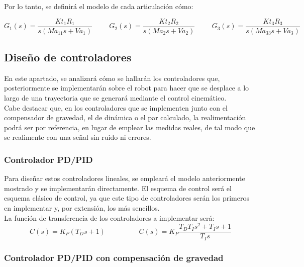 Por lo tanto, se definirá el modelo de cada articulación cómo:

\begin{equation}
G_{1}(s)=\frac{Kt_{1}R_{1}}{s(Ma_{11}s+Va_{1})} \hspace{1cm} G_{2}(s)=\frac{Kt_{2}R_{2}}{s(Ma_{2}s+Va_{2})} \hspace{1cm} G_{3}(s)=\frac{Kt_{3}R_{3}}{s(Ma_{33}s+Va_{3})}
\end{equation}


\newpage
\subsection{Diseño de controladores}

En este apartado, se analizará cómo se hallarán los controladores que, posteriormente se implementarán sobre el robot para hacer que se desplace a lo largo de una trayectoria que se generará mediante el control cinemático.\\

Cabe destacar que, en los controladores que se implementen junto con el compensador de gravedad, el de dinámica o el par calculado, la realimentación podrá ser por referencia, en lugar de emplear las medidas reales, de tal modo que se realimente con una señal sin ruido ni errores.\\

\subsubsection{Controlador PD/PID}

Para diseñar estos controladores lineales, se empleará el modelo anteriormente mostrado y se implementarán directamente. El esquema de control será el esquema clásico de control, ya que este tipo de controladores serán los primeros en implementar y, por extensión, los más sencillos. \\

La función de transferencia de los controladores a implementar será:\\

\begin{equation}
C(s)=K_{P}(T_{D}s+1) \hspace{2cm} C(s)=K_{P}\frac{T_{D}T_{I}s^{2}+T_{I}s+1}{T_{I}s}
\end{equation}



\subsubsection{Controlador PD/PID con compensación de gravedad}

